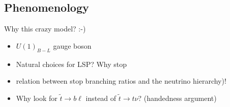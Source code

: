 \subsection{Phenomenology}

{\color{red} Why this crazy model? :-)
\begin{itemize}
\item $U(1)_{B-L}$ gauge boson
\item Natural choices for LSP? Why stop
\item relation between stop branching ratios and the neutrino hierarchy)!
\item Why look for $\tilde{t} \rightarrow b\ell$ instead of
  $\tilde{t} \rightarrow t\nu$? (handedness argument)
\end{itemize}
}

